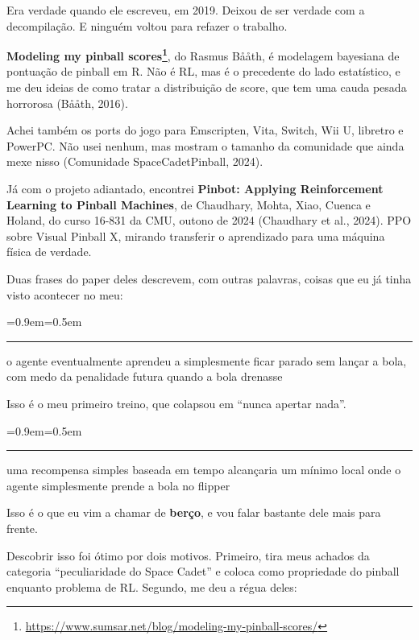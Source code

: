 \documentclass[10pt,a4paper,twoside,twocolumn]{scrartcl}
\renewcommand{\href}[2]{#2\footnote{\raggedright\tiny\sloppy
  \hbadness=10000 \url{#1}}}
\renewenvironment{quote}
  {\begin{list}{}{\leftmargin=0.9em\rightmargin=0pt\topsep=0.5em}\item[]%
   \color{destaque}\itshape\small
   \hspace*{-0.9em}\rule[-0.4em]{1.2pt}{1.1em}\hspace{0.5em}\ignorespaces}
  {\end{list}}
\begin{document}
Era verdade quando ele escreveu, em 2019. Deixou de ser verdade com a
decompilação. E ninguém voltou para refazer o trabalho.

\textbf{\href{https://www.sumsar.net/blog/modeling-my-pinball-scores/}{Modeling
my pinball scores}}, do Rasmus Bååth, é modelagem bayesiana de pontuação
de pinball em R. Não é RL, mas é o precedente do lado estatístico, e me
deu ideias de como tratar a distribuição de score, que tem uma cauda
pesada horrorosa (Bååth, 2016).

Achei também os ports do jogo para Emscripten, Vita, Switch, Wii U,
libretro e PowerPC. Não usei nenhum, mas mostram o tamanho da comunidade
que ainda mexe nisso (Comunidade SpaceCadetPinball, 2024).

Já com o projeto adiantado, encontrei \textbf{Pinbot: Applying
Reinforcement Learning to Pinball Machines}, de Chaudhary, Mohta, Xiao,
Cuenca e Holand, do curso 16-831 da CMU, outono de 2024 (Chaudhary et
al., 2024). PPO sobre Visual Pinball X, mirando transferir o aprendizado
para uma máquina física de verdade.

Duas frases do paper deles descrevem, com outras palavras, coisas que eu
já tinha visto acontecer no meu:

\begin{quote}
o agente eventualmente aprendeu a simplesmente ficar parado sem lançar a
bola, com medo da penalidade futura quando a bola drenasse
\end{quote}

Isso é o meu primeiro treino, que colapsou em ``nunca apertar nada''.

\begin{quote}
uma recompensa simples baseada em tempo alcançaria um mínimo local onde
o agente simplesmente prende a bola no flipper
\end{quote}

Isso é o que eu vim a chamar de \textbf{berço}, e vou falar bastante
dele mais para frente.

Descobrir isso foi ótimo por dois motivos. Primeiro, tira meus achados
da categoria ``peculiaridade do Space Cadet'' e coloca como propriedade
do pinball enquanto problema de RL. Segundo, me deu a régua deles:

\vspace{0.2em}
\begin{center}\small
{}
\end{center}
\vspace{0.1em}
\end{document}
